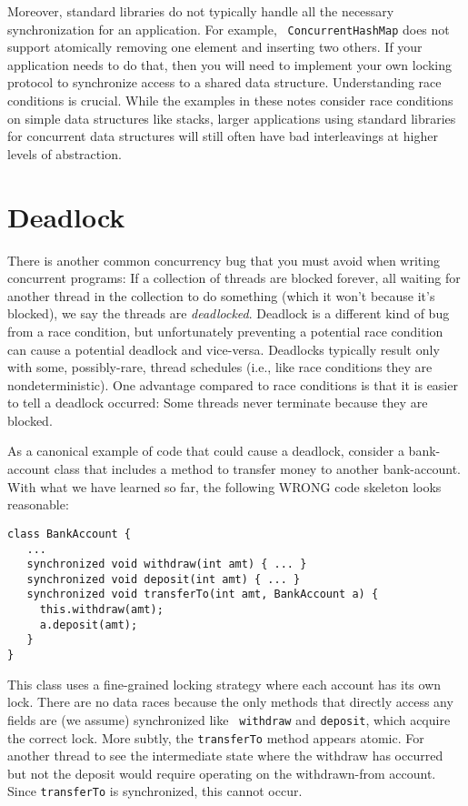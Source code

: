 \documentclass[10pt]{article}
\begin{document}
Moreover, standard libraries do not typically handle all the necessary
synchronization for an application.  For example, {\tt
  ConcurrentHashMap} does not support atomically removing one element
and inserting two others.  If your application needs to do that, then
you will need to implement your own locking protocol to synchronize
access to a shared data structure.  Understanding race conditions is
crucial.  While the examples in these notes consider race conditions
on simple data structures like stacks, larger applications using
standard libraries for concurrent data structures will still often
have bad interleavings at higher levels of abstraction.

\section{Deadlock}
\label{sec:deadlock}

There is another common concurrency bug that you must avoid when
writing concurrent programs: If a collection of threads are blocked
forever, all waiting for another thread in the collection to do
something (which it won't because it's blocked), we say the threads
are \emph{deadlocked}.  Deadlock is a different kind of bug from a
race condition, but unfortunately preventing a potential race
condition can cause a potential deadlock and vice-versa.  Deadlocks
typically result only with some, possibly-rare, thread schedules
(i.e., like race conditions they are nondeterministic).  One
advantage compared to race conditions is that it is easier to tell a
deadlock occurred: Some threads never terminate because they are
blocked.

As a canonical example of code that could cause a deadlock, consider a
bank-account class that includes a method to transfer money to another
bank-account.  With what we have learned so far, the following WRONG
code skeleton looks reasonable:
\begin{verbatim}
class BankAccount {
   ...
   synchronized void withdraw(int amt) { ... }
   synchronized void deposit(int amt) { ... }
   synchronized void transferTo(int amt, BankAccount a) {
     this.withdraw(amt);
     a.deposit(amt);
   }
}
\end{verbatim}
This class uses a fine-grained locking strategy where each account has
its own lock.  There are no data races because the only methods that
directly access any fields are (we assume) synchronized like {\tt
  withdraw} and {\tt deposit}, which acquire the correct lock.  More
subtly, the {\tt transferTo} method appears atomic.  For another
thread to see the intermediate state where the withdraw has occurred
but not the deposit would require operating on the withdrawn-from
account.  Since {\tt transferTo} is synchronized, this cannot occur.
\end{document}
